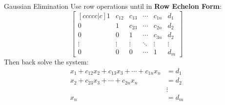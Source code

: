 \documentclass{beamer}
\begin{document}
\begin{frame}
\begin{block}{Gaussian Elimination}
\small
Use row operations until in \textbf{Row Echelon Form}\@:
\begin{equation*}
\begin{bmatrix}[ccccc|c]
1         & c_{12} & c_{13} & \cdots & c_{1n} & d_1\\
0         & 1         & c_{23} & \cdots & c_{2n} & d_2\\
0         & 0         & 1         & \cdots & c_{3n} & d_2\\
\vdots & \vdots  & \vdots &\ddots & \vdots & \vdots\\
0         & 0         & 0         & \cdots  & 1         & d_m
\end{bmatrix}
\end{equation*}\pause
Then back solve the system:
\begin{equation*}
\begin{aligned}
x_1 + c_{12}x_2+c_{13}x_3+\cdots+c_{1n}x_n  &= d_1\\
                    x_2+c_{23}x_3+\cdots+c_{2n}x_n  &= d_2\\
                                                                          &\vdots\\
                                                                   x_n &= d_m          
\end{aligned}
\end{equation*}
\end{block}
\end{frame}
\end{document}
